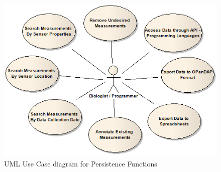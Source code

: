 \begin{figure}[!b]
  \centering
  \includegraphics[scale=0.65]{../diagrams/DSP-Data-Persistence-UseCases-Diagram-Users}
  \caption{UML Use Case diagram for Persistence Functions}
  \label{fig:DSP-Data-Persistence-UseCases-Diagram-Users}
\end{figure}

